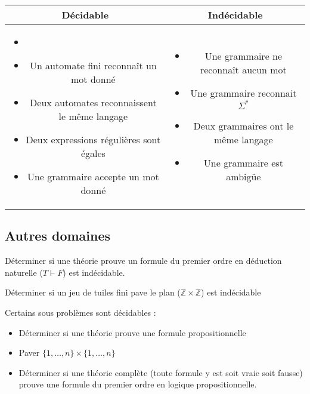 \noindent\begin{tabular}{c|c}
	Décidable & Indécidable \\ \hline
	\begin{minipage}{0.45\linewidth}
		\begin{itemize}[label=$\bullet$]
			\item[]
			\item Un automate fini reconnaît un mot donné
			\item Deux automates reconnaissent le même langage
			\item Deux expressions régulières sont égales
			\item Une grammaire accepte un mot donné
		\end{itemize}
	\end{minipage}
	&\begin{minipage}{0.45\linewidth}
		\begin{itemize}[label=$\bullet$]
			\item Une grammaire ne reconnaît aucun mot
			\item Une grammaire reconnait $\Sigma^*$
			\item Deux grammaires ont le même langage
			\item Une grammaire est ambigüe
		\end{itemize}
	\end{minipage}
\end{tabular}

\subsection{Autres domaines}

\begin{proposition}
	Déterminer si une théorie prouve un formule du premier ordre en déduction naturelle ($T \vdash F$) est indécidable.
\end{proposition}

\begin{proposition}
	Déterminer si un jeu de tuiles fini pave le plan ($\mathbb Z \times \mathbb Z$) est indécidable
\end{proposition}

\begin{rem}
	Certains sous problèmes sont décidables :\begin{itemize}[label=$\bullet$]
		\item Déterminer si une théorie prouve une formule propositionnelle
		\item Paver $\{1, \dots, n\} \times \{1, \dots, n\}$
		\item Déterminer si une théorie complète (toute formule y est soit vraie soit fausse) prouve une formule du premier ordre en logique propositionnelle.
	\end{itemize}
\end{rem}